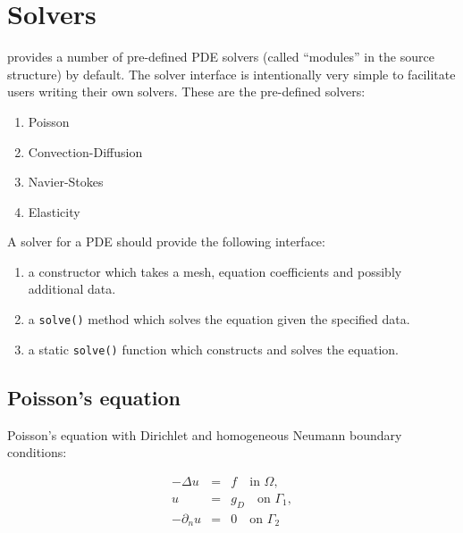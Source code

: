 \chapter{Solvers}

\dolfin{} provides a number of pre-defined PDE solvers (called
``modules'' in the source structure) by default. The solver interface
is intentionally very simple to facilitate users writing their own
solvers. These are the pre-defined solvers:

\begin{enumerate}
\item
Poisson
\item
Convection-Diffusion
\item
Navier-Stokes
\item
Elasticity
\end{enumerate}

A solver for a PDE should provide the following interface:

\begin{enumerate}
\item
a constructor which takes a mesh, equation coefficients and possibly
additional data.
\item
a \texttt{solve()} method which solves the equation given the
specified data.
\item
a static \texttt{solve()} function which constructs and solves the
equation.
\end{enumerate}



\section{Poisson's equation}

Poisson's equation with Dirichlet and homogeneous Neumann boundary
conditions:

\begin{equation} \label{eq:poisson}
  \begin{array}{rcl}
    - \Delta u &=& f \quad \mbox{in } \Omega, \\
    u &=& g_D \quad \mbox{on } \Gamma_1, \\
    - \partial_n u &=& 0 \quad \mbox{on } \Gamma_2
  \end{array}
\end{equation}

